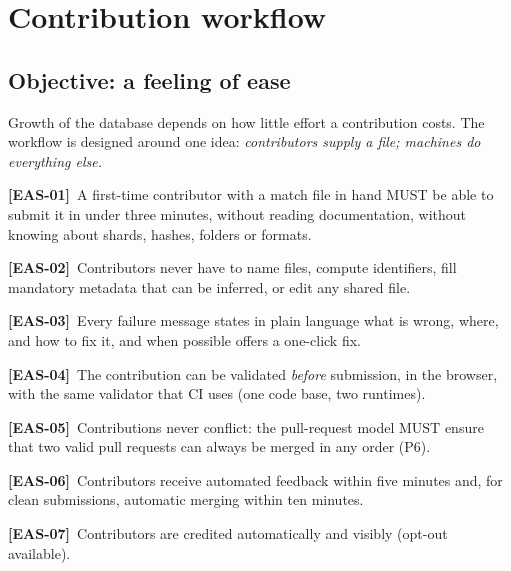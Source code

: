 \documentclass[11pt,a4paper]{article}
\newcommand{\req}[2]{\par\smallskip\noindent\hypertarget{#1}{}\textbf{[#1]}\ #2\par}
\begin{document}
\section{Contribution workflow}\label{sec:contrib}

\subsection{Objective: a feeling of ease}
Growth of the database depends on how little effort a contribution costs. The workflow is designed around one idea: \emph{contributors supply a file; machines do everything else.}

\req{EAS-01}{A first-time contributor with a match file in hand MUST be able to submit it in under three minutes, without reading documentation, without knowing about shards, hashes, folders or formats.}
\req{EAS-02}{Contributors never have to name files, compute identifiers, fill mandatory metadata that can be inferred, or edit any shared file.}
\req{EAS-03}{Every failure message states in plain language what is wrong, where, and how to fix it, and when possible offers a one-click fix.}
\req{EAS-04}{The contribution can be validated \emph{before} submission, in the browser, with the same validator that CI uses (one code base, two runtimes).}
\req{EAS-05}{Contributions never conflict: the pull-request model MUST ensure that two valid pull requests can always be merged in any order (P6).}
\req{EAS-06}{Contributors receive automated feedback within five minutes and, for clean submissions, automatic merging within ten minutes.}
\req{EAS-07}{Contributors are credited automatically and visibly (opt-out available).}
\end{document}
